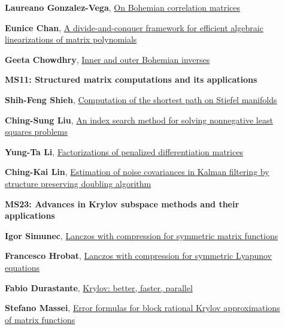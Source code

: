 \documentclass[ILAS2025-program.tex]{subfiles}
\begin{document}
\begin{description}
\begin{description}
        \item[] \hypertarget{up0230}{}\textbf{Laureano Gonzalez-Vega}, \hyperlink{down0230}{On Bohemian correlation matrices}
        \item[] \hypertarget{up0231}{}\textbf{Eunice Chan}, \hyperlink{down0231}{A divide-and-conquer framework for efficient algebraic linearizations of matrix polynomials}
        \item[] \hypertarget{up0232}{}\textbf{Geeta Chowdhry}, \hyperlink{down0232}{Inner and outer Bohemian inverses}
        \end{description}
    \begin{description}
    \item[] {\color{mstitle}\textbf{MS11: Structured matrix computations and its applications}} 
    \item[] \hypertarget{up0233}{}\textbf{Shih-Feng Shieh}, \hyperlink{down0233}{Computation of the shortest path on Stiefel manifolds}
        \item[] \hypertarget{up0234}{}\textbf{Ching-Sung Liu}, \hyperlink{down0234}{An index search method for solving nonnegative least squares problems
}
        \item[] \hypertarget{up0235}{}\textbf{Yung-Ta Li}, \hyperlink{down0235}{Factorizations of penalized differentiation matrices
}
        \item[] \hypertarget{up0236}{}\textbf{Ching-Kai Lin}, \hyperlink{down0236}{Estimation of noise covariances in Kalman filtering by structure preserving doubling algorithm}
        \end{description}
    \begin{description}
    \item[] {\color{mstitle}\textbf{MS23: Advances in Krylov subspace methods and their applications}} 
    \item[] \hypertarget{up0237}{}\textbf{Igor Simunec}, \hyperlink{down0237}{Lanczos with compression for symmetric matrix functions}
        \item[] \hypertarget{up0238}{}\textbf{Francesco Hrobat}, \hyperlink{down0238}{Lanczos with compression for symmetric Lyapunov equations}
        \item[] \hypertarget{up0239}{}\textbf{Fabio Durastante}, \hyperlink{down0239}{Krylov: better, faster, parallel}
        \item[] \hypertarget{up0240}{}\textbf{Stefano Massei}, \hyperlink{down0240}{Error formulas for block rational Krylov approximations of matrix functions}
        \end{description}
    \end{description}
    \newpage
\end{document}
